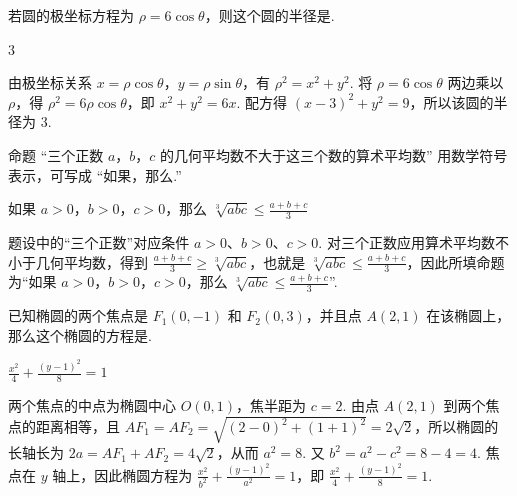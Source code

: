 \documentclass[UTF8,a4paper,oneside,11pt]{ctexbook}
\begin{document}
\begin{problem}

若圆的极坐标方程为 \(\rho = 6\cos\theta \)，则这个圆的半径是\fillinblank{}.
\end{problem}

\begin{answer}
\(3\)
\end{answer}

\begin{solution}
由极坐标关系 \(x=\rho\cos\theta\)，\(y=\rho\sin\theta\)，有 \(\rho^{2}=x^{2}+y^{2}\). 将 \(\rho=6\cos\theta\) 两边乘以 \(\rho\)，得 \(\rho^{2}=6\rho\cos\theta\)，即 \(x^{2}+y^{2}=6x\). 配方得 \((x-3)^{2}+y^{2}=9\)，所以该圆的半径为 \(3\).
\end{solution}

\begin{problem}

命题 “三个正数 \(a\)，\(b\)，\(c\) 的几何平均数不大于这三个数的算术平均数” 用数学符号表示，可写成 “如果\fillinblank{}，那么\fillinblank{}.”
\end{problem}

\begin{answer}
如果 \(a>0\)，\(b>0\)，\(c>0\)，那么 \(\sqrt[3]{abc}\leqslant\frac{a+b+c}{3}\)
\end{answer}

\begin{solution}
题设中的“三个正数”对应条件 \(a>0\)、\(b>0\)、\(c>0\). 对三个正数应用算术平均数不小于几何平均数，得到 \(\frac{a+b+c}{3}\geqslant\sqrt[3]{abc}\)，也就是 \(\sqrt[3]{abc}\leqslant\frac{a+b+c}{3}\)，因此所填命题为“如果 \(a>0\)，\(b>0\)，\(c>0\)，那么 \(\sqrt[3]{abc}\leqslant\frac{a+b+c}{3}\)”.
\end{solution}

\begin{problem}

已知椭圆的两个焦点是 \(F_{1}(0,-1) \) 和 \(F_{2}(0,3) \)，并且点 \(A(2,1) \) 在该椭圆上，那么这个椭圆的方程是\fillinblank{}.
\end{problem}

\begin{answer}
\(\frac{x^{2}}{4}+\frac{(y-1)^{2}}{8}=1\)
\end{answer}

\begin{solution}
两个焦点的中点为椭圆中心 \(O(0,1)\)，焦半距为 \(c=2\). 由点 \(A(2,1)\) 到两个焦点的距离相等，且
\(AF_{1}=AF_{2}=\sqrt{(2-0)^{2}+(1+1)^{2}}=2\sqrt{2}\)，所以椭圆的长轴长为 \(2a=AF_{1}+AF_{2}=4\sqrt{2}\)，从而 \(a^{2}=8\). 又 \(b^{2}=a^{2}-c^{2}=8-4=4\). 焦点在 \(y\) 轴上，因此椭圆方程为 \(\frac{x^{2}}{b^{2}}+\frac{(y-1)^{2}}{a^{2}}=1\)，即 \(\frac{x^{2}}{4}+\frac{(y-1)^{2}}{8}=1\).
\end{solution}
\end{document}
